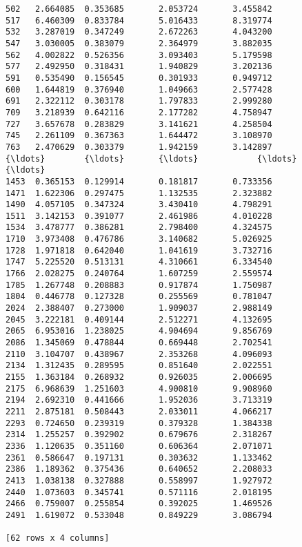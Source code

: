 \documentclass[11pt]{article}
\begin{document}
\begin{Verbatim}[commandchars=\\\{\}]
502   2.664085  0.353685       2.053724       3.455842
517   6.460309  0.833784       5.016433       8.319774
532   3.287019  0.347249       2.672263       4.043200
547   3.030005  0.383079       2.364979       3.882035
562   4.002822  0.526356       3.093403       5.179598
577   2.492950  0.318431       1.940829       3.202136
591   0.535490  0.156545       0.301933       0.949712
600   1.644819  0.376940       1.049663       2.577428
691   2.322112  0.303178       1.797833       2.999280
709   3.218939  0.642116       2.177282       4.758947
727   3.657678  0.283829       3.141621       4.258504
745   2.261109  0.367363       1.644472       3.108970
763   2.470629  0.303379       1.942159       3.142897
{\ldots}        {\ldots}       {\ldots}            {\ldots}            {\ldots}
1453  0.365153  0.129914       0.181817       0.733356
1471  1.622306  0.297475       1.132535       2.323882
1490  4.057105  0.347324       3.430410       4.798291
1511  3.142153  0.391077       2.461986       4.010228
1534  3.478777  0.386281       2.798400       4.324575
1710  3.973408  0.476786       3.140682       5.026925
1728  1.971818  0.642040       1.041619       3.732716
1747  5.225520  0.513131       4.310661       6.334540
1766  2.028275  0.240764       1.607259       2.559574
1785  1.267748  0.208883       0.917874       1.750987
1804  0.446778  0.127328       0.255569       0.781047
2024  2.388407  0.273000       1.909037       2.988149
2045  3.222181  0.409144       2.512271       4.132695
2065  6.953016  1.238025       4.904694       9.856769
2086  1.345069  0.478844       0.669448       2.702541
2110  3.104707  0.438967       2.353268       4.096093
2134  1.312435  0.289595       0.851640       2.022551
2155  1.363184  0.268932       0.926035       2.006695
2175  6.968639  1.251603       4.900810       9.908960
2194  2.692310  0.441666       1.952036       3.713319
2211  2.875181  0.508443       2.033011       4.066217
2293  0.724650  0.239319       0.379328       1.384338
2314  1.255257  0.392902       0.679676       2.318267
2336  1.120635  0.351160       0.606364       2.071071
2361  0.586647  0.197131       0.303632       1.133462
2386  1.189362  0.375436       0.640652       2.208033
2413  1.038138  0.327888       0.558997       1.927972
2440  1.073603  0.345741       0.571116       2.018195
2466  0.759007  0.255854       0.392025       1.469526
2491  1.619072  0.533048       0.849229       3.086794

[62 rows x 4 columns]

    \end{Verbatim}
\end{document}
